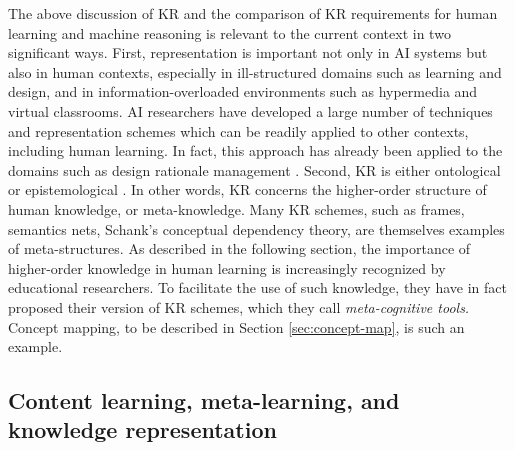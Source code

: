 The above discussion of KR and the comparison of KR requirements for human
learning and machine reasoning is relevant to the current context in two
significant ways. First, representation is important not only in AI systems
but also in human contexts, especially in ill-structured domains such as
learning and design, and in information-overloaded environments such as
hypermedia and virtual classrooms. AI researchers have developed a large
number of techniques and representation schemes which can be readily
applied to other contexts, including human learning. In fact, this approach
has already been applied to the domains such as design rationale management
\cite{Lee91What,Conklin91Process}. Second, KR is either ontological or
epistemological \cite{Swaminathan90}. In other words, KR concerns the
higher-order structure of human knowledge, or meta-knowledge.  Many KR
schemes, such as frames, semantics nets, Schank's conceptual dependency
theory, are themselves examples of meta-structures.  As described in the
following section, the importance of higher-order knowledge in human
learning is increasingly recognized by educational researchers. To
facilitate the use of such knowledge, they have in fact proposed their
version of KR schemes, which they call {\it meta-cognitive tools.\/}
Concept mapping, to be described in Section \ref{sec:concept-map}, is such
an example.


\subsection{Content learning, meta-learning, and knowledge representation}

